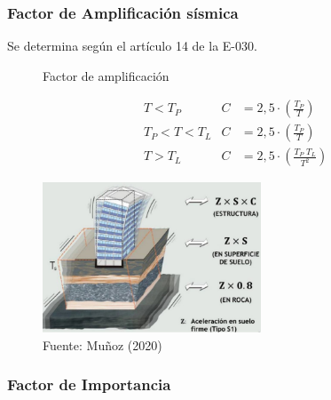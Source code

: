 \documentclass{article}%
\begin{document}
\subsubsection{Factor de Amplificación sísmica}%
\label{ssubsec:FactordeAmplificacinssmica}%
Se determina según el artículo 14 de la E{-}030.%
\setlength{\jot}{0.5cm}%


\begin{figure}[h!]%
\caption{Factor de amplificación}%
\begin{minipage}{0.5\textwidth}%

    \begin{align*}
        &T< T_{P}         &   C&=2,5\cdot\left ( \frac{T_{P}}{T} \right )\\
        &T_{P}< T< T_{L}  &   C&=2,5\cdot\left ( \frac{T_{P}}{T} \right )\\
        &T> T_{L}         &   C&=2,5\cdot\left ( \frac{T_{P}\;T_{L}}{T^{2}} \right )
    \end{align*}%
\end{minipage}%
\begin{minipage}{0.4\textwidth}%
\centering%
\includegraphics[width=6.5cm]{images/Amplificacion}%
\end{minipage}%
\caption*{Fuente: Muñoz (2020)}%
\end{figure}

%
\subsubsection{Factor de Importancia}%
\label{ssubsec:FactordeImportancia}%
\end{document}
